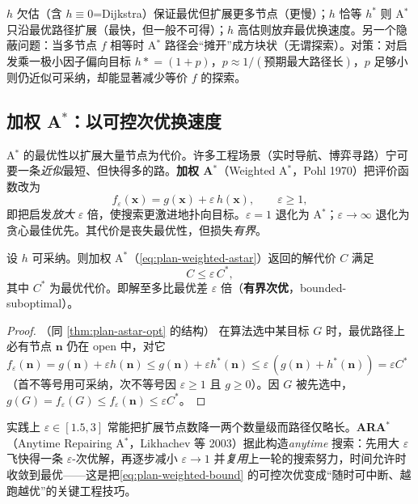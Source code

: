 \begin{pitfall}
$h$ 欠估（含 $h\equiv0$=Dijkstra）保证最优但扩展更多节点（更慢）；$h$ 恰等 $h^*$ 则 A$^*$ 只沿最优路径扩展（最快，但一般不可得）；$h$ 高估则放弃最优换速度。另一个隐蔽问题：当多节点 $f$ 相等时 A$^*$ 路径会“摊开”成方块状（无谓探索）。对策：对启发乘一极小因子偏向目标 $h\mathrel{*}=(1+p)$，$p\approx1/(\text{预期最大路径长})$，$p$ 足够小则仍近似可采纳，却能显著减少等价 $f$ 的探索。
\end{pitfall}

\subsection{加权 A$^*$：以可控次优换速度}
\label{sec:plan-weighted}

A$^*$ 的最优性以扩展大量节点为代价。许多工程场景（实时导航、博弈寻路）宁可要一条\emph{近似}最短、但快得多的路。\textbf{加权 A$^*$}（Weighted A$^*$，Pohl 1970）把评价函数改为
\begin{equation}
  f_\varepsilon(\mathbf{x})=g(\mathbf{x})+\varepsilon\,h(\mathbf{x}),\qquad\varepsilon\ge1,
  \label{eq:plan-weighted-astar}
\end{equation}
即把启发\emph{放大} $\varepsilon$ 倍，使搜索更激进地扑向目标。$\varepsilon=1$ 退化为 A$^*$；$\varepsilon\to\infty$ 退化为贪心最佳优先。其代价是丧失最优性，但损失\emph{有界}。

\begin{theorem}\label{thm:plan-weighted}
设 $h$ 可采纳。则加权 A$^*$（\cref{eq:plan-weighted-astar}）返回的解代价 $C$ 满足
\begin{equation}
  C\le\varepsilon\,C^*,
  \label{eq:plan-weighted-bound}
\end{equation}
其中 $C^*$ 为最优代价。即解至多比最优差 $\varepsilon$ 倍（\textbf{有界次优}，bounded-suboptimal）。
\end{theorem}
\begin{proof}（同 \cref{thm:plan-astar-opt} 的结构）
在算法选中某目标 $G$ 时，最优路径上必有节点 $\mathbf{n}$ 仍在 open 中，对它 $f_\varepsilon(\mathbf{n})=g(\mathbf{n})+\varepsilon h(\mathbf{n})\le g(\mathbf{n})+\varepsilon h^*(\mathbf{n})\le\varepsilon\,(g(\mathbf{n})+h^*(\mathbf{n}))=\varepsilon C^*$（首不等号用可采纳，次不等号因 $\varepsilon\ge1$ 且 $g\ge0$）。因 $G$ 被先选中，$g(G)=f_\varepsilon(G)\le f_\varepsilon(\mathbf{n})\le\varepsilon C^*$。
\end{proof}

\noindent 实践上 $\varepsilon\in[1.5,3]$ 常能把扩展节点数降一两个数量级而路径仅略长。\textbf{ARA$^*$}（Anytime Repairing A$^*$，Likhachev 等 2003\cite{likhachev2004ara}）据此构造\emph{anytime} 搜索：先用大 $\varepsilon$ 飞快得一条 $\varepsilon$-次优解，再逐步减小 $\varepsilon\to1$ 并\emph{复用}上一轮的搜索努力，时间允许时收敛到最优——这是把\cref{eq:plan-weighted-bound} 的可控次优变成“随时可中断、越跑越优”的关键工程技巧。

